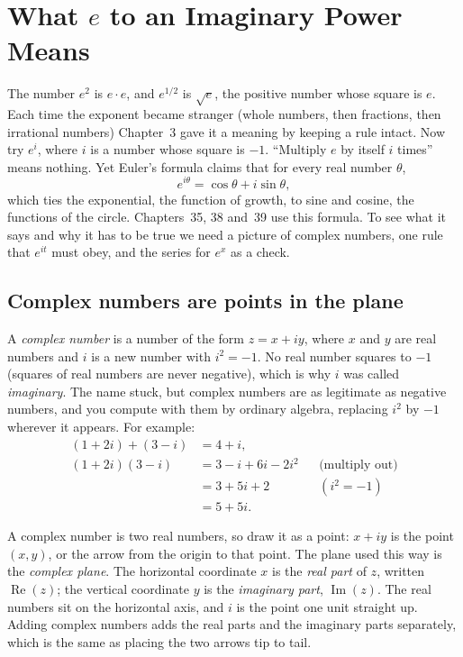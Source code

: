 \section{\texorpdfstring{What $e$ to an Imaginary Power Means}{What e to an Imaginary Power Means}}
\label{ch30:sec-euler}

The number $e^2$ is $e\cdot e$, and $e^{1/2}$ is $\sqrt{e}$, the positive number whose square is $e$. Each time the exponent became stranger (whole numbers, then fractions, then irrational numbers) Chapter~3 gave it a meaning by keeping a rule intact. Now try $e^{i}$, where $i$ is a number whose square is $-1$. ``Multiply $e$ by itself $i$ times'' means nothing. Yet Euler's formula claims that for every real number $\theta$,
\[
  e^{i\theta} = \cos\theta + i\sin\theta,
\]
which ties the exponential, the function of growth, to sine and cosine, the functions of the circle. Chapters~35, 38 and~39 use this formula. To see what it says and why it has to be true we need a picture of complex numbers, one rule that $e^{it}$ must obey, and the series for $e^x$ as a check.

\subsection{Complex numbers are points in the plane}
\label{ch30:sec-complex-plane}

A \emph{complex number} is a number of the form $z = x + iy$, where $x$ and $y$ are real numbers and $i$ is a new number with $i^2 = -1$. No real number squares to $-1$ (squares of real numbers are never negative), which is why $i$ was called \emph{imaginary}. The name stuck, but complex numbers are as legitimate as negative numbers, and you compute with them by ordinary algebra, replacing $i^2$ by $-1$ wherever it appears. For example:
\begin{align*}
  (1+2i) + (3-i) &= 4 + i, \\[2pt]
  (1+2i)(3-i) &= 3 - i + 6i - 2i^2 && \text{(multiply out)}\\
              &= 3 + 5i + 2 && (i^2 = -1)\\
              &= 5 + 5i.
\end{align*}

A complex number is two real numbers, so draw it as a point: $x + iy$ is the point $(x, y)$, or the arrow from the origin to that point. The plane used this way is the \emph{complex plane}. The horizontal coordinate $x$ is the \emph{real part} of $z$, written $\operatorname{Re}(z)$; the vertical coordinate $y$ is the \emph{imaginary part}, $\operatorname{Im}(z)$. The real numbers sit on the horizontal axis, and $i$ is the point one unit straight up. Adding complex numbers adds the real parts and the imaginary parts separately, which is the same as placing the two arrows tip to tail.

